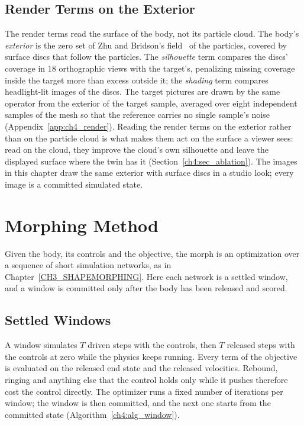 \subsection{Render Terms on the Exterior}
\label{ch4:sec_exterior}
The render terms read the surface of the body, not its particle cloud. The body's \emph{exterior} is the zero set of Zhu
and Bridson's field~\citep{zhu2005sand} of the particles, covered by surface discs that follow the particles. The
\emph{silhouette} term compares the discs' coverage in 18 orthographic views with the target's, penalizing missing
coverage inside the target more than excess outside it; the \emph{shading} term compares headlight-lit images of the
discs. The target pictures are drawn by the same operator from the exterior of the target sample, averaged over eight
independent samples of the mesh so that the reference carries no single sample's noise (Appendix~\ref{app:ch4_render}).
Reading the render terms on the exterior rather than on the particle cloud is what makes them act on the surface a viewer
sees: read on the cloud, they improve the cloud's own silhouette and leave the displayed surface where the twin has it
(Section~\ref{ch4:sec_ablation}). The images in this chapter draw the same exterior with surface discs in a studio look;
every image is a committed simulated state.

\section{Morphing Method}
\label{ch4:sec_method}

Given the body, its controls and the objective, the morph is an optimization over a sequence of short simulation
networks, as in Chapter~\ref{CH3_SHAPEMORPHING}. Here each network is a settled window, and a window is committed only
after the body has been released and scored.

\subsection{Settled Windows}
A window simulates $T$ driven steps with the controls, then $T$ released steps with the controls at zero while the
physics keeps running. Every term of the objective is evaluated on the released end state and the released velocities.
Rebound, ringing and anything else that the control holds only while it pushes therefore cost the control directly. The
optimizer runs a fixed number of iterations per window; the window is then committed, and the next one starts from the
committed state (Algorithm~\ref{ch4:alg_window}).

